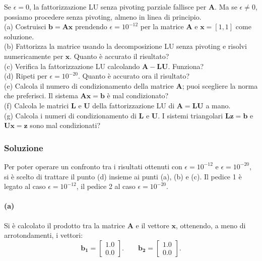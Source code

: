 \documentclass[letterpaper, 12pt]{article}
\begin{document}
Se $\epsilon=0$, la fattorizzazione LU senza pivoting parziale fallisce per $\mathbf{A}$. Ma se $\epsilon\neq 0$, 
possiamo procedere senza pivoting, almeno in linea di principio. \\
(a) Costruisci $\mathbf{b}=\mathbf{Ax}$ prendendo $\epsilon=10^{-12}$ per la matrice $\mathbf{A}$ e 
$\mathbf{x}=[1,1]$ come soluzione. \\
(b) Fattorizza la matrice usando la decomposizione LU senza pivoting e risolvi numericamente per $\mathbf{x}$. 
Quanto è accurato il risultato? \\
(c) Verifica la fattorizzazione LU calcolando $\mathbf{A}-\mathbf{LU}$. Funziona? \\
(d) Ripeti per $\epsilon=10^{-20}$. Quanto è accurato ora il risultato? \\
(e) Calcola il numero di condizionamento della matrice $\mathbf{A}$; puoi scegliere la norma che preferisci. 
Il sistema $\mathbf{Ax}=\mathbf{b}$ è mal condizionato? \\
(f) Calcola le matrici $\mathbf{L}$ e $\mathbf{U}$ della fattorizzazione LU di $\mathbf{A}=\mathbf{LU}$ a mano. \\
(g) Calcola i numeri di condizionamento di $\mathbf{L}$ e $\mathbf{U}$. I sistemi triangolari 
$\mathbf{L}\mathbf{z}=\mathbf{b}$ e $\mathbf{U}\mathbf{x}=\mathbf{z}$ sono mal condizionati? \\

\subsubsection{Soluzione}
Per poter operare un confronto tra i risultati ottenuti con $\epsilon = 10^{-12}$ e $\epsilon = 10^{-20}$, si è
scelto di trattare il punto (d) insieme ai punti (a), (b) e (c). Il pedice 1 è legato al caso $\epsilon = 10^{-12}$,
il pedice 2 al caso $\epsilon = 10^{-20}$. \\

\paragraph{(a) } Si è calcolato il prodotto tra la matrice $\mathbf{A}$ e il vettore $\mathbf{x}$, ottenendo, 
a meno di arrotondamenti, i vettori:
\begin{equation}
    \mathbf{b_1} = \begin{bmatrix}
         1.0 \\
         0.0
    \end{bmatrix}.
\qquad
    \mathbf{b_2} = \begin{bmatrix}
         1.0\\
         0.0
    \end{bmatrix}.
\end{equation}
\end{document}
